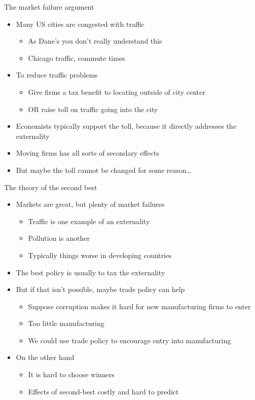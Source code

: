 \documentclass{beamer}
\begin{document}
\begin{frame}{The market failure argument}
    \begin{itemize}
        \item Many US cities are congested with traffic 
        \begin{itemize}
            \item As Dane's you don't really understand this
            \item Chicago traffic, commute times
        \end{itemize}
        \item To reduce traffic problems
        \begin{itemize}
            \item Give firms a tax benefit to locating outside of city center
            \item OR raise toll on traffic going into the city
        \end{itemize}
        \item Economists typically support the toll, because it directly addresses the externality 
        \item Moving firms has all sorts of secondary effects
        \item But maybe the toll cannot be changed for some reason\dots
    \end{itemize}
\end{frame}

\begin{frame}{The theory of the second best}
    \begin{itemize}
        \item Markets are great, but plenty of market failures
        \begin{itemize}
            \item Traffic is one example of an externality
            \item Pollution is another
            \item Typically things worse in developing countries
        \end{itemize}
        \item The best policy is usually to tax the externality
        \item But if that isn't possible, maybe trade policy can help
        \begin{itemize}
            \item Suppose corruption makes it hard for new manufacturing firms to enter
            \item Too little manufacturing
            \item We could use trade policy to encourage entry into manufacturing
        \end{itemize}
        \item On the other hand
        \begin{itemize}
            \item It is hard to choose winners
            \item Effects of second-best costly and hard to predict
        \end{itemize}
    \end{itemize}
\end{frame}
\end{document}

